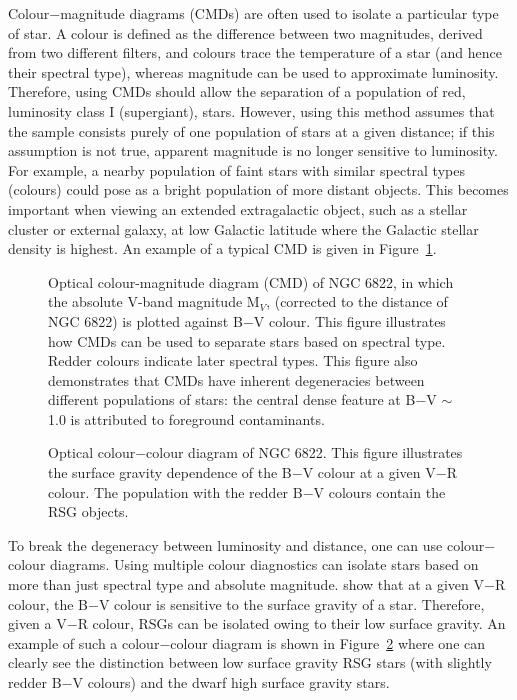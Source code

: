 \documentclass[a4paper,12pt]{article}
\begin{document}
Colour$-$magnitude diagrams (CMDs) are often used to isolate a particular type of star. 
A colour is defined as the difference between two magnitudes, derived from  two different filters, and colours trace the temperature of a star (and hence their spectral type), whereas magnitude can be used to approximate luminosity. 
Therefore, using CMDs should allow the separation of a population of red, luminosity class I (supergiant), stars. 
However, using this method assumes that the sample consists purely of one population of stars at a given distance; if this assumption is not true, apparent magnitude is no longer sensitive to luminosity. 
For example, a nearby population of faint stars with similar spectral types (colours) could pose as a bright population of more distant objects.
This becomes important when viewing an extended extragalactic object, such as a stellar cluster or external galaxy, at low Galactic latitude where the Galactic stellar density is highest. 
An example of a typical CMD is given in Figure~\ref{CMD}. 
\begin{figure}[t]
  \begin{center}
  \epsfxsize=150mm         %
  \caption{Optical colour-magnitude diagram (CMD) of NGC 6822, in which the absolute V-band magnitude M$_{V}$, (corrected to the distance of NGC 6822) is plotted against B$-$V colour.
This figure illustrates how CMDs can be used to separate stars based on spectral type. Redder colours indicate later spectral types. 
This figure also demonstrates that CMDs have inherent degeneracies  between different populations of stars: the central dense feature at B$-$V $\sim$ 1.0 is attributed to foreground contaminants.}
    \label{CMD}
    \end{center}
 \end{figure}

\begin{figure}[t]
  \begin{center}
  \epsfxsize=150mm         %
  \caption{Optical colour$-$colour diagram of NGC 6822. This figure illustrates the surface gravity dependence of the B$-$V colour at a given V$-$R colour. The population with the redder B$-$V colours contain the RSG objects.}
    \label{CCD}
    \end{center}
 \end{figure}

To break the degeneracy between luminosity and distance, one can use colour$-$colour diagrams. 
Using multiple colour diagnostics can isolate stars based on more than just spectral type and absolute magnitude.
\cite{Massey98} show that at a given V$-$R colour, the B$-$V colour is sensitive to the surface gravity of a star. 
Therefore, given a V$-$R colour, RSGs can be isolated owing to their low surface gravity. 
An example of such a colour$-$colour diagram is shown in Figure~\ref{CCD} where one can clearly see the distinction between low surface gravity RSG stars (with slightly redder B$-$V colours) and the dwarf high surface gravity stars. 
\end{document}
